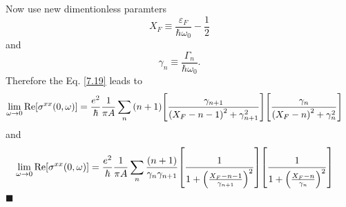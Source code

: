 \noindent
Now use new dimentionless paramters
\begin{equation} \label{7.20}
  X_F \equiv \frac{\varepsilon_F}{\hbar \omega_0} -\frac{1}{2}
\end{equation}
and
\begin{equation} \label{7.21}
  \gamma_n \equiv \frac{\Gamma_n}{\hbar \omega_0}.
\end{equation}
Therefore the Eq. \eqref{7.19} leads to
\begin{equation} \label{7.22}
  \begin{aligned}
    \lim_{\omega \to 0}
    \text{Re}[{\sigma}^{xx}(0,\omega)] & =
    \frac{e^2}{\hbar}
    \frac{1}{\pi A}
    \sum_{n}
    \qty(n+1)
    \qty[
    \frac{\gamma_{n+1}
    }
    {
    \qty(
    X_F - n - 1
    )^2
    + \gamma^2_{n+1}
    }]
    \qty[
    \frac{\gamma_{n}
    }
    {
    \qty(
    X_F - n
    )^2
    + \gamma^2_{n}
    }]
  \end{aligned}
\end{equation}
and
\begin{equation} \label{7.23}
  \begin{aligned}
    \lim_{\omega \to 0}
    \text{Re}[{\sigma}^{xx}(0,\omega)] & =
    \frac{e^2}{\hbar}
    \frac{1}{\pi A}
    \sum_{n}
    \frac{\qty(n+1)}{\gamma_{n}\gamma_{n+1}}
    \qty[
      \frac{1}
      {
        1 + \qty(\frac{X_F - n -1}{\gamma_{n+1}})^2
      }
    ]
    \qty[
      \frac{1}
      {
        1 + \qty(\frac{X_F - n}{\gamma_{n}})^2
      }
    ]
  \end{aligned}
\end{equation}
\hfill$\blacksquare$

